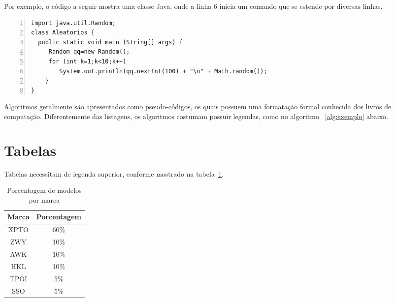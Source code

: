 \documentclass{article}
\begin{document}
Por exemplo, o c\'odigo a seguir mostra uma classe Java, onde a linha 6 inicia um comando que se estende por diversas linhas. 


\lstset{tabsize=5,language=C,showstringspaces=false,basicstyle=\ttfamily\small,keywordstyle=\bf,breaklines=true}
\begin{singlespacing}
\begin{lstlisting}[frame=single,framexrightmargin=1pt,numbers=left]
import java.util.Random;
class Aleatorios {
  public static void main (String[] args) {
     Random qq=new Random();
     for (int k=1;k<10;k++)
        System.out.println(qq.nextInt(100) + "\n" + Math.random());
    }
}
\end{lstlisting}
\end{singlespacing}

 Algoritmos geralmente s\~ao apresentados como pseudo-c\'odigos, os quais possuem uma formata\c{c}\~ao formal conhecida dos livros de computa\c{c}\~ao. Diferentemente das listagens, os algoritmos costumam possuir legendas, como no algoritmo ~\ref{alg:exemplo} abaixo.

\begin{algorithm}
\label{alg:exemplo}
 \caption{Ler n\'umero e imprimir se \'e par ou n\~ao.}

\end{algorithm}


\section{Tabelas}

Tabelas necessitam de legenda superior, conforme mostrado na tabela~\ref{tab:modelos}.

\begin{table}[ht]
   \centering
   \caption{Porcentagem de modelos por marca}
   \label{tab:modelos}
   \begin{tabular}{| c | c |}
      \hline 
      Marca & Porcentagem \\
      \hline \hline 
      XPTO & 60\% \\
      \hline
      ZWY & 10\% \\
      \hline
      AWK & 10\% \\
      \hline
      HKL & 10\% \\
      \hline
      TPOI & 5\% \\
      \hline
      SSO & 5\% \\
      \hline
   \end{tabular} 
\end{table}
\end{document}
